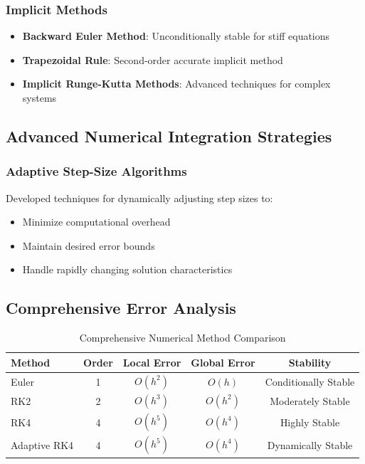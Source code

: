 \documentclass[12pt,a4paper]{article}
\begin{document}
\subsubsection{Implicit Methods}
\begin{itemize}
    \item \textbf{Backward Euler Method}: Unconditionally stable for stiff equations
    \item \textbf{Trapezoidal Rule}: Second-order accurate implicit method
    \item \textbf{Implicit Runge-Kutta Methods}: Advanced techniques for complex systems
\end{itemize}

\subsection{Advanced Numerical Integration Strategies}

\subsubsection{Adaptive Step-Size Algorithms}
Developed techniques for dynamically adjusting step sizes to:
\begin{itemize}
    \item Minimize computational overhead
    \item Maintain desired error bounds
    \item Handle rapidly changing solution characteristics
\end{itemize}

\subsection{Comprehensive Error Analysis}

\begin{table}[h]
\centering
\begin{tabular}{lcccc}
\toprule
\textbf{Method} & \textbf{Order} & \textbf{Local Error} & \textbf{Global Error} & \textbf{Stability} \\
\midrule
Euler & 1 & $O(h^2)$ & $O(h)$ & Conditionally Stable \\
RK2 & 2 & $O(h^3)$ & $O(h^2)$ & Moderately Stable \\
RK4 & 4 & $O(h^5)$ & $O(h^4)$ & Highly Stable \\
Adaptive RK4 & 4 & $O(h^5)$ & $O(h^4)$ & Dynamically Stable \\
\bottomrule
\end{tabular}
\caption{Comprehensive Numerical Method Comparison}
\end{table}
\newpage
\end{document}
